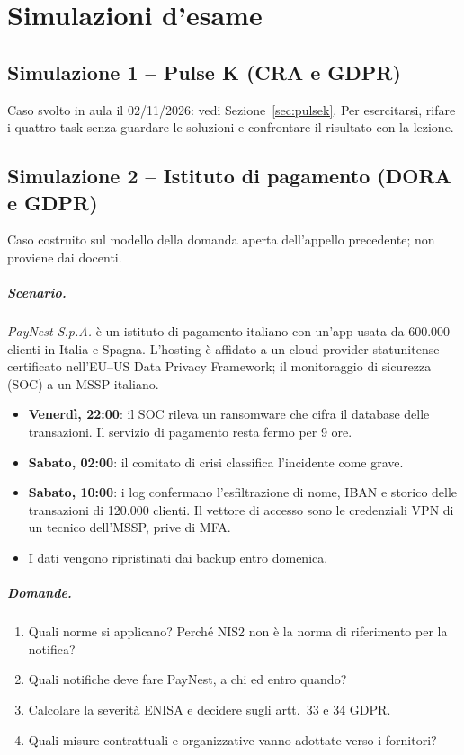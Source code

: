 \chapter{Simulazioni d'esame}
\label{cap:simulazioni}

\section{Simulazione 1 -- Pulse K (CRA e GDPR)}
Caso svolto in aula il 02/11/2026: vedi Sezione~\ref{sec:pulsek}. Per esercitarsi, rifare i quattro
task senza guardare le soluzioni e confrontare il risultato con la lezione.

\section{Simulazione 2 -- Istituto di pagamento (DORA e GDPR)}

\begin{nota}
Caso costruito sul modello della domanda aperta dell'appello precedente; non proviene dai docenti.
\end{nota}

\paragraph{Scenario.} \emph{PayNest S.p.A.} è un istituto di pagamento italiano con un'app usata da
600.000 clienti in Italia e Spagna. L'hosting è affidato a un cloud provider statunitense certificato
nell'EU--US Data Privacy Framework; il monitoraggio di sicurezza (SOC) a un MSSP italiano.
\begin{itemize}
  \item \textbf{Venerdì, 22:00}: il SOC rileva un ransomware che cifra il database delle transazioni.
    Il servizio di pagamento resta fermo per 9 ore.
  \item \textbf{Sabato, 02:00}: il comitato di crisi classifica l'incidente come grave.
  \item \textbf{Sabato, 10:00}: i log confermano l'esfiltrazione di nome, IBAN e storico delle
    transazioni di 120.000 clienti. Il vettore di accesso sono le credenziali VPN di un tecnico
    dell'MSSP, prive di MFA.
  \item I dati vengono ripristinati dai backup entro domenica.
\end{itemize}

\paragraph{Domande.}
\begin{enumerate}[label=\Alph*)]
  \item Quali norme si applicano? Perché NIS2 non è la norma di riferimento per la notifica?
  \item Quali notifiche deve fare PayNest, a chi ed entro quando?
  \item Calcolare la severità ENISA e decidere sugli artt.~33 e 34 GDPR.
  \item Quali misure contrattuali e organizzative vanno adottate verso i fornitori?
\end{enumerate}

